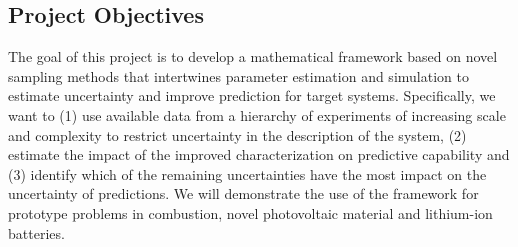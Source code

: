 \documentclass[11pt]{article}
\begin{document}
\subsection*{Project Objectives}

The goal of this project is to develop a mathematical framework  
based on novel sampling methods that
intertwines parameter estimation and simulation 
to estimate uncertainty and improve prediction for target systems.
Specifically, we want to
(1) use available data from a hierarchy
of experiments of increasing scale and complexity to restrict
uncertainty in the description of the system, (2) estimate the impact of the improved characterization
on predictive capability and (3) identify which of the remaining uncertainties have the most impact
on the uncertainty of predictions.
We will demonstrate the use of the framework for prototype problems in combustion,
novel photovoltaic material and lithium-ion batteries.




 
\end{document}
